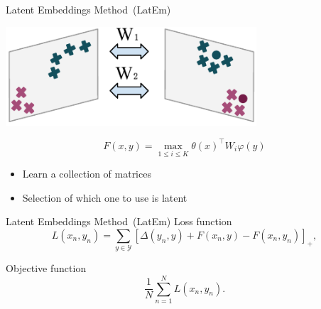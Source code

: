 \documentclass[mathserif, xcolor=table]{beamer}
\def\D{\Delta}
\def\Y{\mathcal{Y}}
\def\Y{\mathcal{Y}}
\begin{document}
\begin{frame}{Latent Embeddings Method~(LatEm)}
\vspace{-4mm}
\begin{center}
\includegraphics[width=0.7\textwidth]{Latem}
\end{center}
\vspace{-4mm}
\begin{equation*}
F(x,y) = \max_{1\leq i \leq K} \theta(x)^\top W_i \varphi(y)
\end{equation*}
\pause

\begin{itemize}
	\item Learn a collection of matrices
	\item Selection of which one to use is latent
\end{itemize}

\end{frame}


\begin{frame}{Latent Embeddings Method~(LatEm)}
Loss function
\begin{equation*}
    L(x_n,y_n) = \sum_{y \in \Y} \left[\D(y_n,y) + F(x_n,y) -F(x_n,y_n)\right]_+,
\end{equation*}
\pause

Objective function
\begin{equation*}
\frac{1}{N} \sum_{n=1}^{N} L(x_n, y_n).
\end{equation*}

\end{frame}
\end{document}
